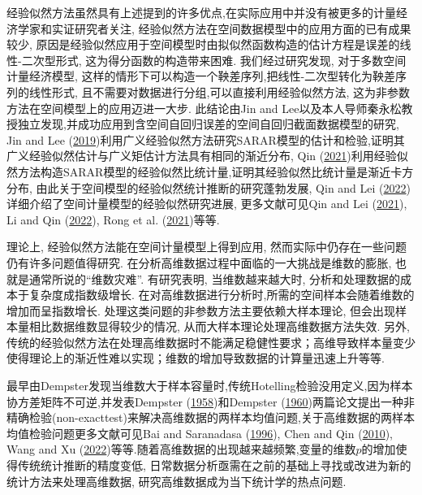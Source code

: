 \documentclass[cs4size]{article}
\def\link{\hyperlink}
\begin{document}
经验似然方法虽然具有上述提到的许多优点,在实际应用中并没有被更多的计量经济学家和实证研究者关注, 经验似然方法在空间数据模型中的应用方面的已有成果较少, 原因是经验似然应用于空间模型时由拟似然函数构造的估计方程是误差的线性-二次型形式, 这为得分函数的构造带来困难. 我们经过研究发现, 对于多数空间计量经济模型, 这样的情形下可以构造一个鞅差序列,把线性-二次型转化为鞅差序列的线性形式, 且不需要对数据进行分组,可以直接利用经验似然方法, 这为非参数方法在空间模型上的应用迈进一大步. 此结论由Jin and Lee以及本人导师秦永松教授独立发现,并成功应用到含空间自回归误差的空间自回归截面数据模型的研究, Jin and Lee (\link{Jin and Lee 2019}{2019})利用广义经验似然方法研究SARAR模型的估计和检验,证明其广义经验似然估计与广义矩估计方法具有相同的渐近分布, Qin (\link{Qin 2021}{2021})利用经验似然方法构造SARAR模型的经验似然比统计量,证明其经验似然比统计量是渐近卡方分布, 由此关于空间模型的经验似然统计推断的研究蓬勃发展, Qin and Lei (\link{Qin and Lei 2022}{2022})详细介绍了空间计量模型的经验似然研究进展, 更多文献可见Qin and Lei (\link{Qin and Lei}{2021}), Li and Qin (\link{Li and Qin 2022}{2022}), Rong et al. (\link{Rong et al. 2021}{2021})等等. 

理论上, 经验似然方法能在空间计量模型上得到应用, 然而实际中仍存在一些问题仍有许多问题值得研究. 在分析高维数据过程中面临的一大挑战是维数的膨胀, 也就是通常所说的“维数灾难”. 有研究表明, 当维数越来越大时, 分析和处理数据的成本于复杂度成指数级增长. 在对高维数据进行分析时,所需的空间样本会随着维数的增加而呈指数增长. 处理这类问题的非参数方法主要依赖大样本理论, 但会出现样本量相比数据维数显得较少的情况, 从而大样本理论处理高维数据方法失效. 另外, 传统的经验似然方法在处理高维数据时不能满足稳健性要求；高维导致样本量变少使得理论上的渐近性难以实现；维数的增加导致数据的计算量迅速上升等等. 

最早由Dempster发现当维数大于样本容量时,传统Hotelling检验没用定义,因为样本协方差矩阵不可逆,并发表Dempster (\link{Dempster 1958}{1958})和Dempster (\link{Dempster 1960}{1960})两篇论文提出一种非精确检验(non-exacttest)来解决高维数据的两样本均值问题,关于高维数据的两样本均值检验问题更多文献可见Bai and Saranadasa (\link{Bai and Saranadasa 1996}{1996}), Chen and Qin (\link{Chen and Qin 2010}{2010}), Wang and Xu (\link{Wang and Xu 2022}{2022})等等.随着高维数据的出现越来越频繁,变量的维数$p$的增加使得传统统计推断的精度变低, 日常数据分析亟需在之前的基础上寻找或改进为新的统计方法来处理高维数据, 研究高维数据成为当下统计学的热点问题. 
\end{document}
